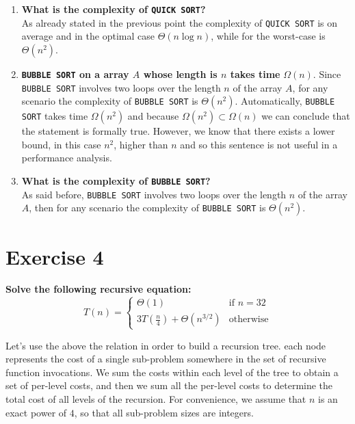 \documentclass{article}
\begin{document}
\begin{enumerate}[label=(\alph*)]
		\item \textbf{What is the complexity of \texttt{QUICK SORT}?}\\
		As already stated in the previous point the complexity of \texttt{QUICK SORT} is on average and in the optimal case $\Theta(n\log n)$, while for the worst-case is $\Theta(n^2)$.
		\item \textbf{\texttt{BUBBLE SORT} on a array $A$ whose length is $n$ takes time} $\Omega(n)$.
		Since \texttt{BUBBLE SORT} involves two loops over the length $n$ of the array $A$, for any scenario the complexity of \texttt{BUBBLE SORT} is $\Theta(n^2)$. Automatically, \texttt{BUBBLE SORT} takes time $\Omega(n^2)$ and because $\Omega(n^2) \subset \Omega(n) $ we can conclude that the statement is formally true. However, we know that there exists a lower bound, in this case $n^2$, higher than $n$ and so this sentence is not useful in a performance analysis. 
		\item  \textbf{What is the complexity of \texttt{BUBBLE SORT}?} \\
		As said before,  \texttt{BUBBLE SORT} involves two loops over the length $n$ of the array $A$, then for any scenario the complexity of \texttt{BUBBLE SORT} is $\Theta(n^2)$. 
	\end{enumerate}

	\section*{Exercise 4}
	\textbf{Solve the following recursive equation:}
	$$
	T(n) = \begin{cases}
			\Theta(1) & \text{if } n= 32 \\
			3T(\frac{n}{4}) + \Theta(n^{3/2}) & \text{otherwise}
			\end{cases} 
	$$
	
	\noindent Let's use the above the relation in order to build a recursion tree.  each node represents the cost of a single sub-problem somewhere in the set of recursive function invocations. We sum the costs within each level of the tree to obtain a set of per-level costs, and then we sum all the per-level costs to determine the total cost of all levels of the recursion. For convenience, we assume that $n$ is an exact power of $4$, so that all sub-problem sizes are integers. \\
	
\end{document}
